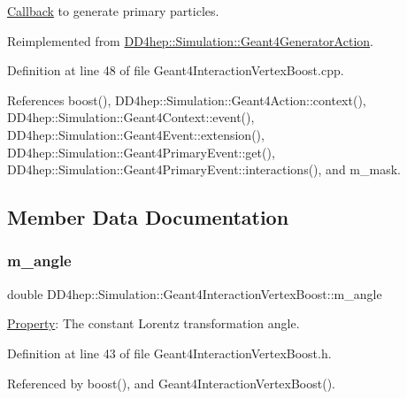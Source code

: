 \hyperlink{class_d_d4hep_1_1_callback}{Callback} to generate primary particles. 



Reimplemented from \hyperlink{class_d_d4hep_1_1_simulation_1_1_geant4_generator_action_ac5a1d2335a19e3f9d555081199e01801}{D\+D4hep\+::\+Simulation\+::\+Geant4\+Generator\+Action}.



Definition at line 48 of file Geant4\+Interaction\+Vertex\+Boost.\+cpp.



References boost(), D\+D4hep\+::\+Simulation\+::\+Geant4\+Action\+::context(), D\+D4hep\+::\+Simulation\+::\+Geant4\+Context\+::event(), D\+D4hep\+::\+Simulation\+::\+Geant4\+Event\+::extension(), D\+D4hep\+::\+Simulation\+::\+Geant4\+Primary\+Event\+::get(), D\+D4hep\+::\+Simulation\+::\+Geant4\+Primary\+Event\+::interactions(), and m\+\_\+mask.



\subsection{Member Data Documentation}
\hypertarget{class_d_d4hep_1_1_simulation_1_1_geant4_interaction_vertex_boost_a545bdd5e80a80a03f613c7f9bd2e3c6c}{}\label{class_d_d4hep_1_1_simulation_1_1_geant4_interaction_vertex_boost_a545bdd5e80a80a03f613c7f9bd2e3c6c} 
\subsubsection{\texorpdfstring{m\+\_\+angle}{m\_angle}}
{\footnotesize\ttfamily double D\+D4hep\+::\+Simulation\+::\+Geant4\+Interaction\+Vertex\+Boost\+::m\+\_\+angle\hspace{0.3cm}{\ttfamily [protected]}}



\hyperlink{class_d_d4hep_1_1_property}{Property}\+: The constant Lorentz transformation angle. 



Definition at line 43 of file Geant4\+Interaction\+Vertex\+Boost.\+h.



Referenced by boost(), and Geant4\+Interaction\+Vertex\+Boost().

